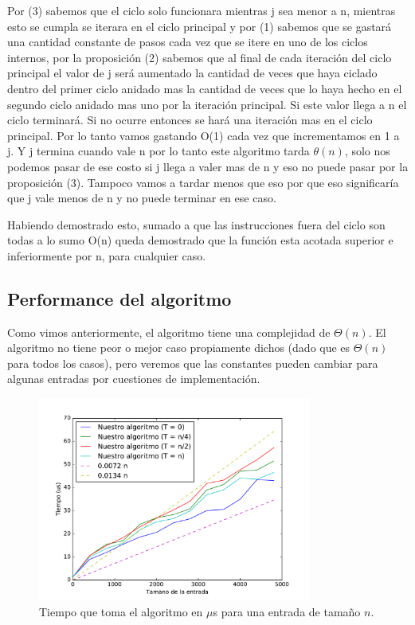 Por (3) sabemos que el ciclo solo funcionara mientras j sea menor a n, mientras esto se cumpla se iterara en el ciclo principal y por (1) sabemos que se gastará una cantidad constante de pasos cada vez que se itere en uno de los ciclos internos, por la proposición (2) sabemos que al final de cada iteración del ciclo principal el valor de j será aumentado la cantidad de veces que haya ciclado dentro del primer ciclo anidado mas la cantidad de veces que lo haya hecho en el segundo ciclo anidado mas uno por la iteración principal. Si este valor llega a n el ciclo terminará. Si no ocurre entonces se hará una iteración mas en el ciclo principal. Por lo tanto vamos gastando O(1) cada vez que incrementamos en 1 a j. Y j termina cuando vale n por lo tanto este algoritmo tarda $\theta(n)$, solo nos podemos pasar de ese costo si j llega a valer mas de n y eso no puede pasar por la proposición (3). Tampoco vamos a tardar menos que eso por que eso significaría que j vale menos de n y no puede terminar en ese caso.

Habiendo demostrado esto, sumado a que las instrucciones fuera del ciclo son todas a lo sumo O(n) queda demostrado que la función esta acotada superior e inferiormente por n, para cualquier caso.

\subsection{Performance del algoritmo}

Como vimos anteriormente, el algoritmo tiene una complejidad de $\Theta(n)$. El algoritmo no tiene peor o mejor caso propiamente dichos (dado que es $\Theta(n)$ para todos los casos), pero veremos que las constantes pueden cambiar para algunas entradas por cuestiones de implementación.

\begin{figure}[H]
 \centering
	\includegraphics[width=0.8\textwidth]{img/tiempos/genkidama1.pdf}
	\caption{\footnotesize Tiempo que toma el algoritmo en $\mu$s para una entrada de tamaño $n$.}
	\label{fig:genkidama-tiempos1}
\end{figure}

